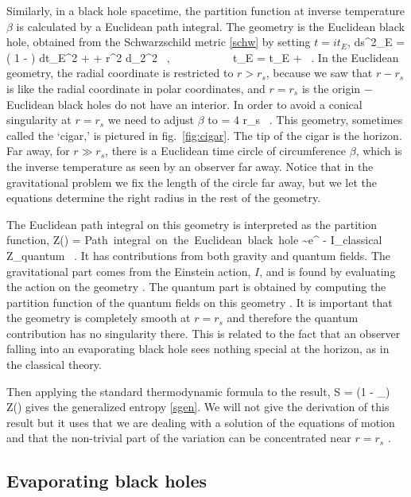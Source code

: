 Similarly, in a black hole spacetime, the partition function at inverse temperature $\beta$ is calculated by a Euclidean path integral. The geometry is the Euclidean black hole, obtained from the Schwarzschild metric \eqref{schw} by setting $t = i t_E$,
\be {}
ds^2_E = \left( 1 -  \right) dt_E^2 +  + r^2 d\Omega_2^2 \ , ~~~~~~~~~~ t_E = t_E + \beta \ .
\ee
In the Euclidean geometry, the radial coordinate is restricted to $r> r_s$, because we saw that $r-r_s$ is like the radial coordinate in polar coordinates, and $r=r_s$ is the origin   $-$ Euclidean black holes do not have an interior. In order to avoid a conical singularity at $r=r_s$ we need to adjust $\beta$ to 
\be 
\beta = 4 \pi r_s  \ .
\ee
 This geometry, sometimes called the `cigar,' is pictured in fig.~\ref{fig:cigar}. The tip of the cigar is the horizon. Far away, for $r \gg r_s$, there is a Euclidean time circle of circumference $\beta$, which is the inverse temperature as seen by an observer far away. Notice that in the gravitational problem we fix the length of the circle far away, but we let the equations determine the right radius in the rest of the geometry. 

The Euclidean path integral on this geometry is interpreted as the partition function,
\be
Z(\beta)  = \mbox{Path integral on the Euclidean black hole} \sim  e^{ - I_{\rm classical}} Z_{\rm quantum}  \ .
\ee
It has contributions from both gravity and quantum fields. The gravitational part comes from the Einstein action, $I$,  and is found by evaluating the action on the geometry . The quantum part is obtained by computing the partition function of the quantum fields on this geometry .
It is important that the geometry is completely smooth at $r=r_s$ and therefore the quantum contribution has no singularity there. 
 This is related to the fact that an observer falling into an evaporating  black hole sees nothing special at the horizon, as in the classical theory. 
 
 Then applying the standard thermodynamic formula to the result,
\be
S = (1 - \beta \p_\beta) \log Z(\beta)
\ee
gives the generalized entropy \eqref{sgen}. We will not give the derivation of this result but it uses that we are dealing with a solution of the equations of motion and that the non-trivial part of the variation can be concentrated near 
$r=r_s$  \cite{Gibbons:1977mu }.  

\subsection{Evaporating black holes}


